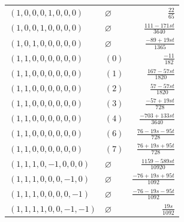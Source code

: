 \begin{longtable}{@{}llr@{}}
$(1,0,0,0,1,0,0,0)$ & $\varnothing$ & $\frac{22}{65}$\\
$(1,0,0,1,0,0,0,0)$ & $\varnothing$ & $\frac{111-171st}{3640}$\\
$(1,0,1,0,0,0,0,0)$ & $\varnothing$ & $\frac{-89+19st}{1365}$\\
$(1,1,0,0,0,0,0,0)$ & $(0)$ & $\frac{-11}{182}$\\
$(1,1,0,0,0,0,0,0)$ & $(1)$ & $\frac{167-57st}{1820}$\\
$(1,1,0,0,0,0,0,0)$ & $(2)$ & $\frac{57-57st}{1820}$\\
$(1,1,0,0,0,0,0,0)$ & $(3)$ & $\frac{-57+19st}{728}$\\
$(1,1,0,0,0,0,0,0)$ & $(4)$ & $\frac{-703+133st}{3640}$\\
$(1,1,0,0,0,0,0,0)$ & $(6)$ & $\frac{76-19s-95t}{728}$\\
$(1,1,0,0,0,0,0,0)$ & $(7)$ & $\frac{76+19s+95t}{728}$\\
$(1,1,1,0,-1,0,0,0)$ & $\varnothing$ & $\frac{1159-589st}{10920}$\\
$(1,1,1,0,0,0,-1,0)$ & $\varnothing$ & $\frac{-76+19s+95t}{1092}$\\
$(1,1,1,0,0,0,0,-1)$ & $\varnothing$ & $\frac{-76-19s-95t}{1092}$\\
$(1,1,1,1,0,0,-1,-1)$ & $\varnothing$ & $\frac{19s}{1092}$\\
\end{longtable}
\endgroup
